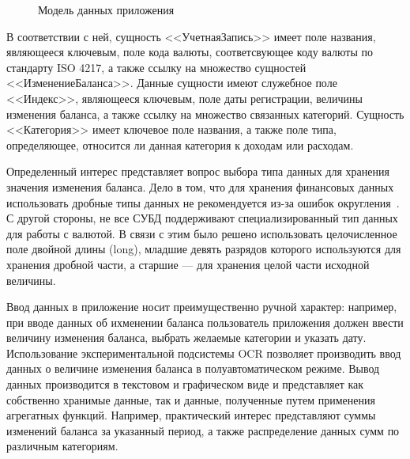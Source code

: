\begin{figure}[h!]
  \centering
  \caption{Модель данных приложения}
  \label{fig:design_entities}
\end{figure}

В соответствии с ней, сущность <<УчетнаяЗапись>> имеет поле названия,
являющееся ключевым, поле кода валюты, соответсвующее коду валюты по
стандарту ISO 4217, а также ссылку на множество сущностей
<<ИзменениеБаланса>>. Данные сущности имеют служебное поле <<Индекс>>,
являющееся ключевым, поле даты регистрации, величины изменения баланса,
а также ссылку на множество связанных категорий.
Сущность <<Категория>> имеет ключевое поле названия, а также поле типа,
определяющее, относится ли данная категория к доходам или расходам.

Определенный интерес представляет вопрос выбора типа данных для хранения
значения изменения баланса. Дело в том, что для хранения финансовых данных
использовать дробные типы данных не рекомендуется
из-за ошибок округления~\cite{bloch08}. С другой стороны, не все СУБД
поддерживают специализированный тип данных для работы с валютой.
В связи с этим было решено использовать целочисленное
поле двойной длины (long), младшие девять разрядов которого используются
для хранения дробной части, а старшие --- для хранения целой части
исходной величины.

Ввод данных в приложение носит преимущественно ручной характер:
например, при вводе данных об ихменении баланса
пользователь приложения должен ввести величину изменения баланса,
выбрать желаемые категории и указать дату.
Использование экспериментальной подсистемы OCR позволяет производить
ввод данных о величине изменения баланса в полуавтоматическом режиме.
Вывод данных производится в текстовом и графическом виде и
представляет как собственно хранимые данные, так и данные, полученные путем
применения агрегатных функций. Например, практический интерес представляют
суммы изменений баланса за указанный период, а также распределение
данных сумм по различным категориям.



